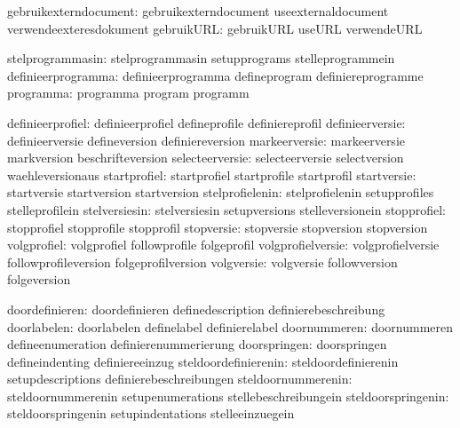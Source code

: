         gebruikexterndocument:  gebruikexterndocument        useexternaldocument
                                verwendeexteresdokument
                   gebruikURL:  gebruikURL                   useURL
                                verwendeURL %

             stelprogrammasin:  stelprogrammasin             setupprograms
                                stelleprogrammein
           definieerprogramma:  definieerprogramma           defineprogram
                                definiereprogramme
                    programma:  programma                    program
                                programm

             definieerprofiel:  definieerprofiel             defineprofile
                                definiereprofil
              definieerversie:  definieerversie              defineversion
                                definiereversion
                markeerversie:  markeerversie                markversion
                                beschrifteversion
              selecteerversie:  selecteerversie              selectversion
                                waehleversionaus
                 startprofiel:  startprofiel                 startprofile
                                startprofil
                  startversie:  startversie                  startversion
                                startversion
              stelprofielenin:  stelprofielenin              setupprofiles
                                stelleprofilein
                stelversiesin:  stelversiesin                setupversions
                                stelleversionein
                  stopprofiel:  stopprofiel                  stopprofile
                                stopprofil
                   stopversie:  stopversie                   stopversion
                                stopversion
                  volgprofiel:  volgprofiel                  followprofile
                                folgeprofil
            volgprofielversie:  volgprofielversie            followprofileversion
                                folgeprofilversion
                   volgversie:  volgversie                   followversion
                                folgeversion

               doordefinieren:  doordefinieren               definedescription
                                definierebeschreibung
                  doorlabelen:  doorlabelen                  definelabel
                                definierelabel
                 doornummeren:  doornummeren                 defineenumeration
                                definierenummerierung
                 doorspringen:  doorspringen                 defineindenting
                                definiereeinzug
         steldoordefinierenin:  steldoordefinierenin         setupdescriptions
                                definierebeschreibungen
           steldoornummerenin:  steldoornummerenin           setupenumerations
                                stellebeschreibungein
           steldoorspringenin:  steldoorspringenin           setupindentations
                                stelleeinzuegein

